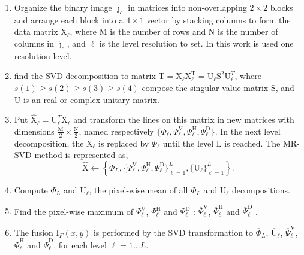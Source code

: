 \documentclass[journal]{IEEEtran}
\begin{document}
\begin{enumerate}
\item Organize the binary image $\bm{\widehat\jmath}_c$ in matrices into non-overlapping $2\times 2$ blocks and arrange each block into a $4\times 1$ vector by stacking columns to form the data matrix $\text{X}_\ell$, where M is the number of rows and N is the number of columns in $\bm{\widehat\jmath}_c$, and $\ell$ is the level resolution to set. In this work is used one resolution level.
\item find the SVD decomposition to matrix $\text{T}=\text{X}_\ell \text{X}_\ell^\text{T}=\text{U}_\ell \text{S}^2 \text{U}_\ell^T$, where $s(1)\geq s(2) \geq s(3) \geq s(4)$ compose the singular value matrix S, and U is an real or complex unitary matrix.
\item Put $\widehat{\text{X}}_\ell=\text{U}_\ell^T\text{X}_\ell$ and transform the lines on this matrix in new matrices with dimensions $\frac{\text{M}}{2}\times\frac{\text{N}}{2}$, named respectively $\{\Phi_\ell, \Psi_\ell^\text{V}, \Psi_\ell^\text{H}, \Psi_\ell^\text{D}\}$. In the next level decomposition, the $\text{X}_\ell$ is replaced by $\Phi_\ell$ until the level L is reached. The MR-SVD method is represented as,
\begin{equation}\label{msvd_iter}
\widehat{\text{X}}\leftarrow \left\{\Phi_L,\{\Psi_\ell^\text{V},\Psi_\ell^\text{H},\Psi_\ell^\text{D} \}_{\ell=1}^L,\{\text{U}_\ell\}_{\ell=1}^L \right\}.
\end{equation}
\item Compute $\overline{\Phi}_L$ and $\overline{\text{U}}_\ell$, the pixel-wise mean of all $\Phi_L$ and $\text{U}_\ell$ decompositions.
\item Find the pixel-wise maximum of $\Psi_\ell^\text{V}$, $\Psi_\ell^\text{H}$ and $\Psi_\ell^\text{D}$ : $\overline{\Psi}_\ell^\text{V}$, $\overline{\Psi}_\ell^\text{H}$ and $\overline{\Psi}_\ell^\text{D}$ .
\item The fusion $\text{I}_F(x,y)$ is performed by the SVD transformation to $\overline{\Phi}_L$, $\overline{\text{U}}_\ell$, $\overline{\Psi}_\ell^\text{V}$, $\overline{\Psi}_\ell^\text{H}$ and $\overline{\Psi}_\ell^\text{D}$,  for each level $\ell=1\dots L$. 
\end{enumerate}
\end{document}
